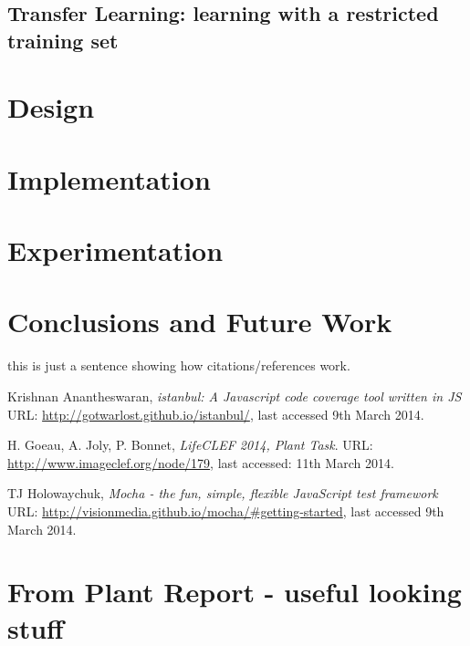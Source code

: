 \documentclass[a4paper,11pt]{article}
\begin{document}
\subsection{Transfer Learning: learning with a restricted training set}



\clearpage
\section{Design}




\clearpage
\section{Implementation}




\clearpage
\section{Experimentation}




\clearpage
\section{Conclusions and Future Work}

this is just \cite{istanbul} a sentence \cite{plantclef}	showing \cite{mocha} how citations/references work.

\clearpage

\begin{thebibliography}{1}

 Krishnan Anantheswaran,
  \emph{istanbul: A Javascript code coverage tool written in JS}\\
 URL: \url{http://gotwarlost.github.io/istanbul/}, last accessed 9th March 2014.

  H. Goeau, A. Joly, P. Bonnet,
  \emph{LifeCLEF 2014,  Plant Task}.
 URL: \url{http://www.imageclef.org/node/179}, last accessed: 11th March 2014.

 TJ Holowaychuk,
  \emph{Mocha - the fun, simple, flexible JavaScript test framework}\\
 URL: \url{http://visionmedia.github.io/mocha/#getting-started}, last accessed 9th March 2014. 

\end{thebibliography}

\clearpage
\section{From Plant Report - useful looking stuff}
\end{document}
